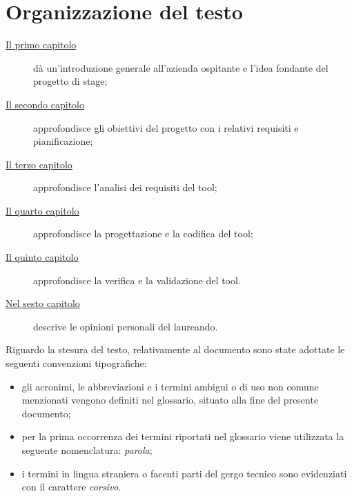 
\section{Organizzazione del testo}\label{sec:organizzazione-del-testo}
\begin{description}
    \item[{\hyperref[ch:introduzione]{Il primo capitolo}}] dà un'introduzione generale all'azienda ospitante e l'idea fondante del progetto di stage;

    \item[{\hyperref[ch:descrizione-stage]{Il secondo capitolo}}] approfondisce gli obiettivi del progetto con i relativi requisiti e pianificazione;

    \item[{\hyperref[ch:analisi-requisiti]{Il terzo capitolo}}] approfondisce l'analisi dei requisiti del tool;

    \item[{\hyperref[ch:progettazione-e-codifica]{Il quarto capitolo}}] approfondisce la progettazione e la codifica del tool;

    \item[{\hyperref[ch:verifica-validazione]{Il quinto capitolo}}] approfondisce la verifica e la validazione del tool.

    \item[{\hyperref[ch:conclusioni]{Nel sesto capitolo}}] descrive le opinioni personali del laureando.
\end{description}

Riguardo la stesura del testo, relativamente al documento sono state adottate le seguenti convenzioni tipografiche:
\begin{itemize}
	\item gli acronimi, le abbreviazioni e i termini ambigui o di uso non comune menzionati vengono definiti nel glossario, situato alla fine del presente documento;
	\item per la prima occorrenza dei termini riportati nel glossario viene utilizzata la seguente nomenclatura: \emph{parola}\glsfirstoccur;
	\item i termini in lingua straniera o facenti parti del gergo tecnico sono evidenziati con il carattere \emph{corsivo}.
\end{itemize}
